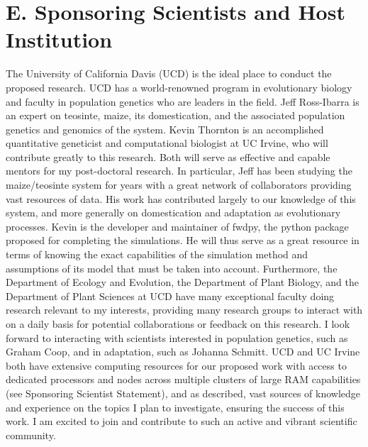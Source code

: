 \section*{E. Sponsoring Scientists and Host Institution}\vspace{-1ex}

The University of California Davis (UCD) is the ideal place to conduct the proposed research. UCD has a world-renowned program in evolutionary biology and faculty in population genetics who are leaders in the field. Jeff Ross\--Ibarra is an expert on teosinte, maize, its domestication, and the associated population genetics and genomics of the system. Kevin Thornton is an accomplished quantitative geneticist and computational biologist at UC Irvine, who will contribute greatly to this research. Both will serve as effective and capable mentors for my post-doctoral research. In particular, Jeff has been studying the maize\//teosinte system for years with a great network of collaborators providing vast resources of data. His work has contributed largely to our knowledge of this system, and more generally on domestication and adaptation as evolutionary processes. Kevin is the developer and maintainer of fwdpy, the python package proposed for completing the simulations. He will thus serve as a great resource in terms of knowing the exact capabilities of the simulation method and assumptions of its model that must be taken into account. Furthermore, the Department of Ecology and Evolution, the Department of Plant Biology, and the Department of Plant Sciences at UCD have many exceptional faculty doing research relevant to my interests, providing many research groups to interact with on a daily basis for potential collaborations or feedback on this research. I look forward to interacting with scientists interested in population genetics, such as Graham Coop, and in adaptation, such as Johanna Schmitt. %
UCD and UC Irvine both have extensive computing resources for our proposed work with access to dedicated processors and nodes across multiple clusters of large RAM capabilities (see Sponsoring Scientist Statement), and as described, vast sources of knowledge and experience on the topics I plan to investigate, ensuring the success of this work. I am excited to join and contribute to such an active and vibrant scientific community.\vspace{-3ex}

